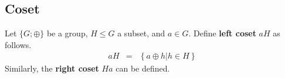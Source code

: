 \subsection{Coset}

Let $\{G;\oplus\}$ be a group, $H \leq G$ a subset, and $a\in G$. Define \textbf{left coset} $aH$ as follows.
\begin{eqnarray}
  aH &=& \left\{a\oplus h| h \in H \right\} \nonumber
\end{eqnarray} 
Similarly, the \textbf{right coset} $Ha$ can be defined.





























